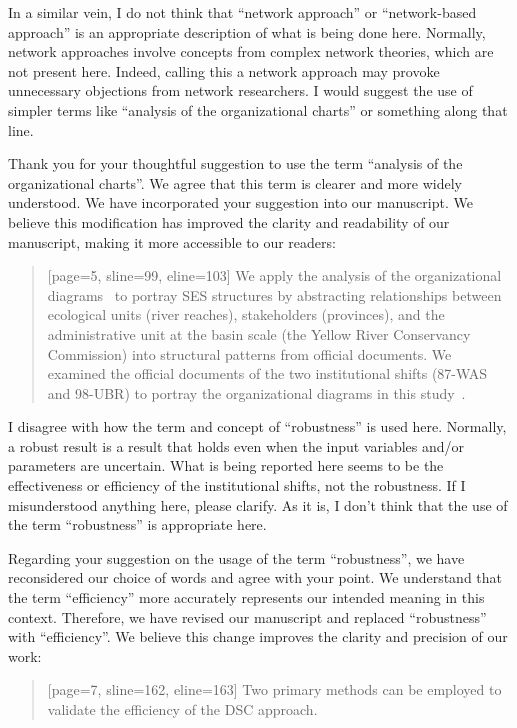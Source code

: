 \RC{} In a similar vein, I do not think that ``network approach'' or ``network-based approach'' is an appropriate description of what is being done here. Normally, network approaches involve concepts from complex network theories, which are not present here. Indeed, calling this a network approach may provoke unnecessary objections from network researchers. I would suggest the use of simpler terms like ``analysis of the organizational charts'' or something along that line.

\AR{} Thank you for your thoughtful suggestion to use the term ``analysis of the organizational charts''. We agree that this term is clearer and more widely understood. We have incorporated your suggestion into our manuscript. We believe this modification has improved the clarity and readability of our manuscript, making it more accessible to our readers:

\begin{quote}[page=5, sline=99, eline=103]
    We apply the analysis of the organizational diagrams~\cite{bodin2017b} to portray SES structures by abstracting relationships between ecological units (river reaches), stakeholders (provinces), and the administrative unit at the basin scale (the Yellow River Conservancy Commission) into structural patterns from official documents.
    We examined the official documents of the two institutional shifts (87-WAS and 98-UBR) to portray the organizational diagrams in this study~\cite{bodin2017a,kluger2020,guerrero2015}.
\end{quote}

\RC{} I disagree with how the term and concept of ``robustness'' is used here. Normally, a robust result is a result that holds even when the input variables and/or parameters are uncertain. What is being reported here seems to be the effectiveness or efficiency of the institutional shifts, not the robustness. If I misunderstood anything here, please clarify. As it is, I don't think that the use of the term ``robustness'' is appropriate here.

\AR{} Regarding your suggestion on the usage of the term ``robustness'', we have reconsidered our choice of words and agree with your point. We understand that the term ``efficiency'' more accurately represents our intended meaning in this context. Therefore, we have revised our manuscript and replaced ``robustness'' with ``efficiency''. We believe this change improves the clarity and precision of our work:

\begin{quote}[page=7, sline=162, eline=163]
    Two primary methods can be employed to validate the efficiency of the DSC approach.
\end{quote}

